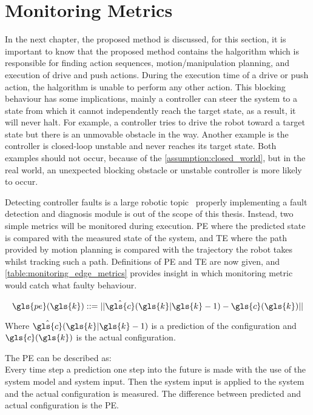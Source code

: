 \section{Monitoring Metrics}%
\label{sec:monitoring_metrics}
In the next chapter, the proposed method is discussed, for this section, it is important to know that the proposed method contains the \ac{halgorithm} which is responsible for finding action sequences, motion/manipulation planning, and execution of drive and push actions. During the execution time of a drive or push action, the \acl{halgorithm} is unable to perform any other action. This blocking behaviour has some implications, mainly a controller can steer the system to a state from which it cannot independently reach the target state, as a result, it will never halt. For example, a controller tries to drive the robot toward a target state but there is an unmovable obstacle in the way. Another example is the controller is closed-loop unstable and never reaches its target state. Both examples should not occur, because of the \cref{assumption:closed_world}, but in the real world, an unexpected blocking obstacle or unstable controller is more likely to occur.\bs

Detecting controller faults is a large robotic topic~\cite{khalastchi_fault_2019} properly implementing a fault detection and diagnosis module is out of the scope of this thesis. Instead, two simple metrics will be monitored during execution. \ac{PE} where the predicted state is compared with the measured state of the system, and \ac{TE} where the path provided by motion planning is compared with the trajectory the robot takes whilst tracking such a path. Definitions of \ac{PE} and \ac{TE} are now given, and \cref{table:monitoring_edge_metrics} provides insight in which monitoring metric would catch what faulty behaviour.\bs

\[ \gls{pe}(\gls{k}) ::= ||\hat{\gls{c}}(\gls{k}|\gls{k}-1) - \gls{c}(\gls{k})|| \]

Where $\hat{\gls{c}}(\gls{k}|\gls{k}-1)$ is a prediction of the configuration and $\gls{c}(\gls{k})$ is the actual configuration.\bs 

The \ac{PE} can be described as:\\
Every time step a prediction one step into the future is made with the use of the system model and system input. Then the system input is applied to the system and the actual configuration is measured. The difference between predicted and actual configuration is the \ac{PE}.

